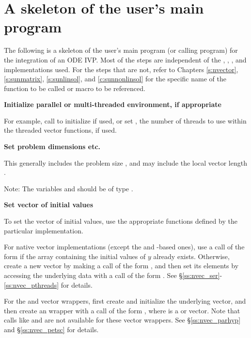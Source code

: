 \section{A skeleton of the user's main program}\label{ss:skeleton_sim}

The following is a skeleton of the user's main program (or calling
program) for the integration of an ODE IVP. Most of the steps are
independent of the {\nvector}, {\sunmatrix}, {\sunlinsol}, and {\sunnonlinsol}
implementations used. For the steps that are not, refer to Chapters
\ref{s:nvector}, \ref{s:sunmatrix}, \ref{s:sunlinsol}, and \ref{c:sunnonlinsol}
for the specific name of the function to be called or macro to be referenced.

\begin{Steps}

\item
  {\bf Initialize parallel or multi-threaded environment, if appropriate}

  For example, call  to initialize {\mpi} if used, or
  set , the number of threads to use within the threaded
  vector functions, if used.

\item
  {\bf Set problem dimensions etc.}

  This generally includes the problem size , and may include
  the local vector length .

  Note: The variables  and  should be of type .

\item
  {\bf Set vector of initial values}

  To set the vector  of initial values, use the appropriate
  functions defined by the particular {\nvector} implementation.

  For native {\sundials} vector implementations
  (except the {\cuda} and {\raja}-based ones), use a call
  of the form  if the  array
   containing the initial values of $y$ already exists.
  Otherwise, create a new vector by making a call of the form
  , and then set its elements by accessing
  the underlying data with a call of the form
  .
  See \S\ref{ss:nvec_ser}-\ref{ss:nvec_pthreads} for details.

  For the {\hypre} and {\petsc} vector wrappers, first create and initialize
  the underlying vector, and then create an {\nvector} wrapper with a call
  of the form , where  is a {\hypre}
  or {\petsc} vector. Note that calls like  and
   are not available for these vector wrappers.
  See \S\ref{ss:nvec_parhyp} and \S\ref{ss:nvec_petsc} for details.


\end{Steps}
